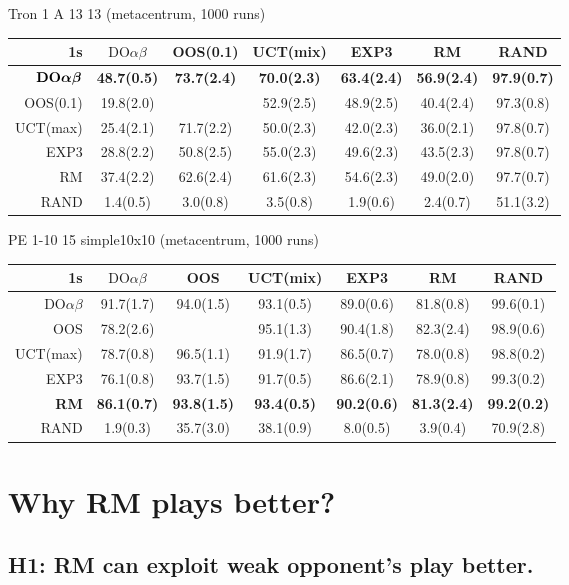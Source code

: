 \documentclass[preprint,12pt]{elsarticle}
\newcommand{\doab}[0]{\textrm{DO}\alpha\beta}
\newcommand{\bdoab}[0]{\textrm{\bf DO}\boldsymbol{\alpha\beta}}
\begin{document}
\begin{scriptsize}
Tron 1 A 13 13 (metacentrum, 1000 runs)\\
\begin{tabular}{|r|cccccc|}\hline
1s &$\doab$&OOS(0.1)&UCT(mix)&EXP3&RM&RAND\\\hline
$\bdoab$&\textbf{48.7(0.5)}&\textbf{73.7(2.4)}&\textbf{70.0(2.3)}&\textbf{63.4(2.4)}&\textbf{56.9(2.4)}&\textbf{97.9(0.7)}\\
OOS(0.1)&19.8(2.0)&&52.9(2.5)&48.9(2.5)&40.4(2.4)&97.3(0.8)\\
UCT(max)&25.4(2.1)&71.7(2.2)&50.0(2.3)&42.0(2.3)&36.0(2.1)&97.8(0.7)\\
EXP3&28.8(2.2)&50.8(2.5)&55.0(2.3)&49.6(2.3)&43.5(2.3)&97.8(0.7)\\
RM&37.4(2.2)&62.6(2.4)&61.6(2.3)&54.6(2.3)&49.0(2.0)&97.7(0.7)\\
RAND&1.4(0.5)&3.0(0.8)&3.5(0.8)&1.9(0.6)&2.4(0.7)&51.1(3.2)\\
\hline
\end{tabular}

PE 1-10 15 simple10x10 (metacentrum, 1000 runs)\\
\begin{tabular}{|r|cccccc|}\hline
1s&$\doab$&OOS&UCT(mix)&EXP3&RM&RAND\\\hline
$\doab$&91.7(1.7)&94.0(1.5)&93.1(0.5)&89.0(0.6)&81.8(0.8)&99.6(0.1)\\
OOS&78.2(2.6)&&95.1(1.3)&90.4(1.8)&82.3(2.4)&98.9(0.6)\\
UCT(max)&78.7(0.8)&96.5(1.1)&91.9(1.7)&86.5(0.7)&78.0(0.8)&98.8(0.2)\\
EXP3&76.1(0.8)&93.7(1.5)&91.7(0.5)&86.6(2.1)&78.9(0.8)&99.3(0.2)\\
\textbf{RM}&\textbf{86.1(0.7)}&\textbf{93.8(1.5)}&\textbf{93.4(0.5)}&\textbf{90.2(0.6)}&\textbf{81.3(2.4)}&\textbf{99.2(0.2)}\\
RAND&1.9(0.3)&35.7(3.0)&38.1(0.9)&8.0(0.5)&3.9(0.4)&70.9(2.8)\\
\hline
\end{tabular}

\end{scriptsize}



\section{Why RM plays better?}

\subsection{H1: RM can exploit weak opponent's play better.}
\end{document}
